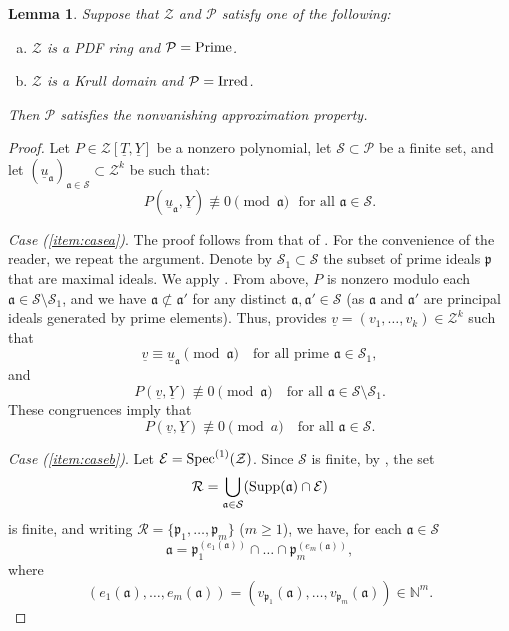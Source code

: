 \documentclass[11pt,a4paper,reqno]{amsart}
\def\s1{{\rm Spec}^{(1)}}
\newtheorem{lem}[thm]{Lemma}
\theoremstyle{definition}
\begin{document}
\begin{lem}\label{lem:chinremthe}
Suppose that ${\mathcal Z}$ and $\mathcal{P}$ satisfy one of the following:
\begin{enumerate}[(a)]
\item $\mathcal{Z}$ is a PDF ring and $\mathcal{P} ={\rm Prime}$.\label{item:casea}
\item $\mathcal{Z}$ is a Krull domain and $\mathcal{P}= {\rm Irred}$.
\label{item:caseb} 
\end{enumerate}
Then $\mathcal{P}$ satisfies the nonvanishing approximation property.
\end{lem}
\begin{proof}
Let $P\in \mathcal{Z}[\underline{T},\underline{Y}]$ be a nonzero polynomial, let $\mathcal{S} \subset \mathcal{P}$ be a finite set, and let $(\underline{u}_{\mathfrak{a}})_{\mathfrak{a} \in \mathcal{S}} \subset \mathcal{Z}^k$ be such that: $$
P(\underline{u}_{\mathfrak{a}},\underline{Y})\not\equiv 0 \pmod{\mathfrak{a}}\,\,\,\,\text{for all}\,\, \mathfrak{a} \in \mathcal{S}.
$$

\noindent
\emph{Case (\ref{item:casea})}. The proof follows from that of \cite[Lemma 4.2]{BDKN22}. For the convenience of the reader, we repeat the argument. Denote by \( \mathcal{S}_1 \subset \mathcal{S} \) the subset of prime ideals \( \mathfrak{p} \) that are maximal ideals. We apply \cite[Lemma 3.8]{BDKN22}. From above, \( P \) is nonzero modulo each \( \mathfrak{a} \in \mathcal{S} \setminus \mathcal{S}_1 \), and we have \( \mathfrak{a} \not\subset \mathfrak{a}'\) for any distinct \( \mathfrak{a}, \mathfrak{a}' \in \mathcal{S}\) (as $\mathfrak{a}$ and $\mathfrak{a}'$ are principal ideals generated by prime elements). Thus, \cite[Lemma 3.8]{BDKN22} provides \( \underline{v} = (v_1, \dots, v_k) \in \mathcal{Z}^k \) such that
\[
\underline{v} \equiv \underline{u}_{\mathfrak{a}} \pmod{\mathfrak{a}} \quad \text{for all prime } \mathfrak{a} \in \mathcal{S}_1,
\]
and
\[
P(\underline{v}, \underline{Y}) \not\equiv 0 \pmod{\mathfrak{a}} \quad \text{for all } \mathfrak{a} \in \mathcal{S} \setminus \mathcal{S}_1.
\]
These congruences imply that
\[
P(\underline{v}, \underline{Y}) \not\equiv 0 \pmod{a} \quad \text{for all } \mathfrak{a} \in \mathcal{S}.
\]
\vskip 1mm


\noindent
\emph{Case (\ref{item:caseb})}. Let $
\mathcal{E}=\s1(\mathcal{Z})$.
Since $\mathcal{S}$ is finite, by \cite[Page 289, III)]{Mat80}, the set 
$$
\mathcal{R}=\bigcup_{\mathfrak{a} \in \mathcal{S}}({\rm Supp}(\mathfrak{a}) \cap \mathcal{E})
$$ is finite, and writing $\mathcal{R}=\{\mathfrak{p}_1,\dots,\mathfrak{p}_m\}$ ($m \geq 1$), we have, for each $\mathfrak{a} \in \mathcal{S}$
$$
\mathfrak{a}=\mathfrak{p}_1^{(e_1(\mathfrak{a}))}\cap \dots \cap \mathfrak{p}_m^{(e_m(\mathfrak{a}))} ,
$$ where 
$$(e_1(\mathfrak{a}),\dots,e_m(\mathfrak{a}))=(v_{\mathfrak{p}_1}(\mathfrak{a}),\dots,v_{\mathfrak{p}_m}(\mathfrak{a}))\in \mathbb{N}^m.
$$ 


\end{proof}
\end{document}
